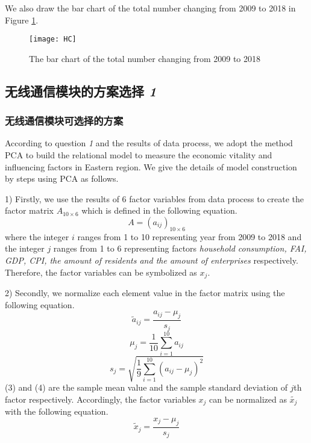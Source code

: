\documentclass{apmcmthesis}
\begin{document}
We also draw the bar chart of the total number changing from 2009 to 2018 in Figure \ref{HC}.
\begin{figure}[h]
  \centering
  \texttt{[image: HC]}
  \caption{The bar chart of the total number changing from 2009 to 2018}\label{HC}
\end{figure}



\subsection{无线通信模块的方案选择 \textit 1}
\subsubsection{ 无线通信模块可选择的方案}
\hspace{2em}According to question \textit 1 and the results of data process, we adopt the method PCA to build the relational model to measure the economic vitality and influencing factors in Eastern region. We give the details of model construction by steps using PCA as follows.

1) Firstly, we use the results of 6 factor variables from data process to create the factor matrix ${{A}_{10\times 6}}$ which is defined in the following equation.
\begin{equation}
A=(a_{ij})_{10\times 6}
\end{equation}
where the integer $i$ ranges from 1 to 10 representing year from 2009 to 2018 and the integer $j$ ranges from 1 to 6 representing factors \textit{household consumption, FAI, GDP, CPI, the amount of residents and the amount of enterprises} respectively. Therefore, the factor variables can be symbolized as $x_j$.

2) Secondly, we normalize each element value in the factor matrix using the following equation.
\begin{equation}
{{\tilde{a}}_{ij}}=\frac{{{a}_{ij}}-{{\mu }_{j}}}{{{s}_{j}}}
\end{equation}
\begin{equation}
{{\mu }_{j}}=\frac{1}{10}\sum\limits_{i=1}^{10}{{{a}_{ij}}}
\end{equation}
\begin{equation}
{{s}_{j}}=\sqrt{\frac{1}{9}\sum\limits_{i=1}^{10}{{{({{a}_{ij}}-{{\mu }_{j}})}^{2}}}}
\end{equation}
(3) and (4) are the sample mean value and the sample standard deviation of $j$th factor respectively. Accordingly, the factor variables $x_j$ can be normalized as ${{\tilde{x_j}}}$ with the following equation.
\begin{equation}
{{\tilde{x}}_{j}}=\frac{{{x}_{j}}-{{\mu }_{j}}}{{{s}_{j}}}
\end{equation}
\end{document}
